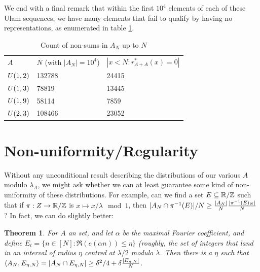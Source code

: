 \documentclass{report}
\newtheorem{theorem}{Theorem}[section]
\newtheorem{definition}[theorem]{Definition}
\theoremstyle{remark}
\numberwithin{equation}{section}
\begin{document}
We end with a final remark that within the first $10^4$ elements of
each of these Ulam sequences, we have many elements that fail to
qualify by having no representations, as enumerated in table
\ref{tab:nonsums_count}.  

\begin{table}
\caption{Count of non-sums in $A_N$ up to
  $N$}\label{tab:nonsums_count}
\centering
\begin{tabular}{|lll|}
\hline
$A$ & $N$ (with $|A_N| = 10^4$) & $|x < N : r^*_{A+A}(x) = 0|$\\
$U(1,2)$ & 132788 & 24415\\
$U(1,3)$ & 78819 & 13445\\
$U(1,9)$ & 58114 & 7859\\
$U(2,3)$ & 108466 & 23052\\\hline
\end{tabular}
\end{table}

\section{Non-uniformity/Regularity}


Without any unconditional result describing the distributions of our
various $A$ modulo $\lambda_A$, we might ask whether we can at least
guarantee some kind of non-uniformity of these distributions.  For
example, can we find a set $E \subseteq \mathbb{R}/\mathbb{Z}$ such that if
$\pi : Z \to \mathbb{R}/\mathbb{Z}$ is $x \mapsto x/\lambda \mod{1}$, then
$|A_N \cap \pi^{-1}(E)|/N \geq
\frac{|A_N|}{N}\frac{|\pi^{-1}(E)_N|}{N}$?  In fact, we can do slightly
better:

\begin{theorem}\label{thm:regularity}
  For $A$ an \relevant set, and let $\alpha$ be the maximal Fourier
  coefficient, and define
  $E_{t} = \{n \in [N] : \Re(e(\alpha n)) \leq \eta\}$ (roughly, the
  set of integers that land in an interval of radius $\eta$ centred at
  $\lambda/2$ modulo $\lambda$.  Then there is a $\eta$ such that
  $\left<A_N, E_{\eta,N}\right> = |A_N \cap E_{\eta,N}| \geq \delta^2/4 +
  \delta \frac{|E_{\eta,N}|}{N}$.
\end{theorem}
\end{document}
